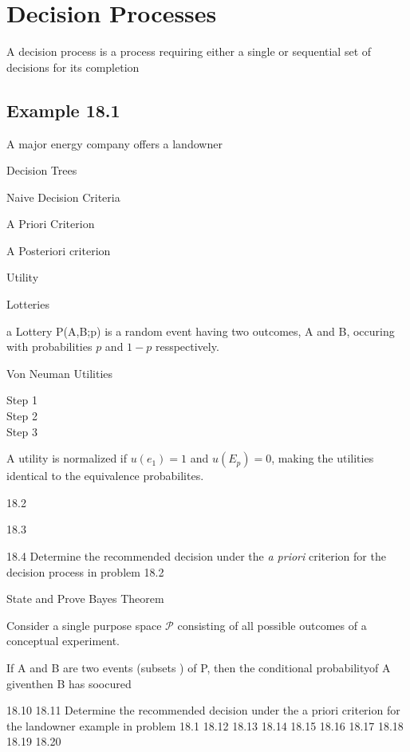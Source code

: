 

\section{Decision Processes}

A decision process is a process requiring either a single or sequential set 
of decisions for its completion


\subsection{Example 18.1}

A major energy company offers a landowner



Decision Trees

Naive Decision Criteria

A Priori Criterion

A Posteriori criterion

Utility




Lotteries

a Lottery P(A,B;p) is a random event having two outcomes, A and B, occuring with probabilities
$p$ and $1-p$ resspectively.

Von Neuman Utilities

\begin{description}
\item[Step 1]
\item[Step 2]
\item[Step 3]
\end{description}

A utility is normalized if $u(e_1)=1$ and $u(E_p)=0$, making the utilities identical to the
equivalence probabilites.


18.2


18.3


18.4 Determine the recommended decision under the \textit{a priori} criterion for the
decision process in problem 18.2


State and Prove Bayes Theorem


Consider a single purpose space $\mathcal{P}$ consisting of all possible outcomes
of a conceptual experiment.

If A and B are two events (subsets ) of P, then the conditional probabilityof A giventhen B has soocured


18.10
18.11
Determine the recommended decision under the a priori criterion for the landowner example in problem 18.1
18.12
18.13
18.14
18.15
18.16
18.17
18.18
18.19
18.20
